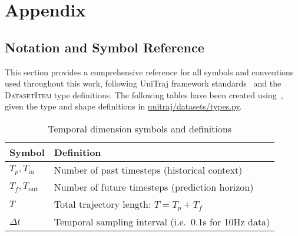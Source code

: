 \appendix
\section{Appendix}

\subsection{Notation and Symbol Reference}
\label{app:notation}

This section provides a comprehensive reference for all symbols and conventions used throughout this work, following UniTraj framework standards~\cite{unitrajFeng2024} and the \textsc{DatasetItem} type definitions. The following tables have been created using~\cite{copilotSonnet}, given the type and shape definitions in \href{https://github.com/JanDuchscherer104/UniTraj/blob/main/unitraj/datasets/types.py}{unitraj/datasets/types.py}.

\begin{table}[H]
\caption{Temporal dimension symbols and definitions}
\centering
\begin{tabular}{p{3cm}p{10cm}}
\toprule
\textbf{Symbol} & \textbf{Definition} \\
\midrule
\(T_p, T_{\text{in}}\) & Number of past timesteps (historical context) \\
\(T_f, T_{\text{out}}\) & Number of future timesteps (prediction horizon) \\
\(T\) & Total trajectory length: \(T = T_p + T_f\) \\
\(\Delta t\) & Temporal sampling interval (i.e.\ 0.1s for 10Hz data) \\
\bottomrule
\end{tabular}
\end{table}

